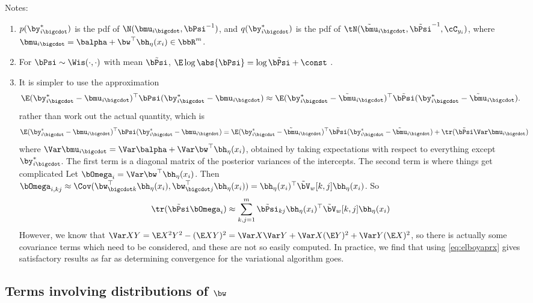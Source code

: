 Notes:
\begin{enumerate}
  \item $p(\by_{i \bigcdot}^*)$ is the pdf of $\N(\bmu_{i \bigcdot}, \bPsi^{-1})$, and $q(\by_{i \bigcdot}^*)$ is the pdf of $\tN(\tilde\bmu_{i \bigcdot}, \tilde\bPsi^{-1}, \cC_{y_i})$, where $\bmu_{i \bigcdot} = \balpha + \bw^\top\bh_\eta(x_i) \in \bbR^m$.
  \item For $\bPsi\sim \Wis(\cdot,\cdot)$ with mean $\tilde\bPsi$, $\E \log \abs{\bPsi} = \log \tilde\bPsi + \const$ \citep[§10.2]{bishop2006pattern}.
  \item It is simpler to use the approximation
  \begin{align}\label{eq:elboyaprx}
    \E (\by^*_{i \bigcdot} - \bmu_{i \bigcdot})^\top \bPsi (\by^*_{i \bigcdot} - \bmu_{i \bigcdot})
    \approx \E (\by^*_{i \bigcdot} - \tilde\bmu_{i \bigcdot})^\top \tilde\bPsi (\by^*_{i \bigcdot} - \tilde\bmu_{i \bigcdot}).   
  \end{align}
  rather than work out the actual quantity, which is
  \begin{align}\label{eq:elboyact}
    \E (\by^*_{i \bigcdot} - \bmu_{i \bigcdot})^\top \bPsi (\by^*_{i \bigcdot} - \bmu_{i \bigcdot})
    &= \E (\by^*_{i \bigcdot} - \tilde\bmu_{i \bigcdot})^\top \tilde\bPsi (\by^*_{i \bigcdot} - \tilde\bmu_{i \bigcdot}) + \tr(\tilde\bPsi\Var \bmu_{i \bigcdot})
  \end{align}
  where $\Var \bmu_{i \bigcdot} = \Var \balpha + \Var \bw^\top\bh_\eta(x_i)$, obtained by taking expectations with respect to everything except $\by^*_{i \bigcdot}$.
  The first term is a diagonal matrix of the posterior variances of the intercepts.
  The second term is where things get complicated 
  Let $\bOmega_i = \Var \bw^\top\bh_\eta(x_i)$. 
  Then $\bOmega_{i,kj} \approx \Cov(\bw^\top_{\bigcdot k}\bh_\eta(x_i), \bw^\top_{\bigcdot j}\bh_\eta(x_i)) = \bh_\eta(x_i)^\top \tilde\bV_w[k,j]\bh_\eta(x_i)$. 
  So
  \[
    \tr(\tilde\bPsi \bOmega_i) \approx \sum_{k,j=1}^m \tilde\bPsi_{kj} \bh_\eta(x_i)^\top \tilde\bV_w[k,j]\bh_\eta(x_i)
  \]
  However, we know that $\Var XY = \E X^2Y^2 - (\E XY)^2 = \Var X \Var Y + \Var X (\E Y)^2 + \Var Y (\E X)^2$, so there is actually some covariance terms which need to be considered, and these are not so easily computed.
  In practice, we find that using \cref{eq:elboyaprx} gives satisfactory results as far as determining convergence for the variational algorithm goes. 
\end{enumerate}

\subsection{Terms involving distributions of $\bw$}


